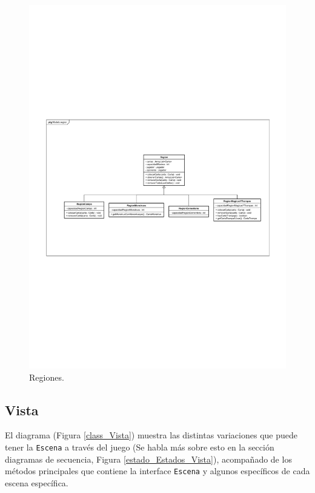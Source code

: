 	\begin{figure}[H]
		\centering
		\includegraphics[scale=0.8]{includes/class_Regiones}
		\caption{Regiones.}
		\label{class_Regiones}
	\end{figure}
	
	\subsection{Vista}
	
	El diagrama (Figura \ref{class_Vista}) muestra las distintas variaciones que puede tener la \texttt{Escena} a través del juego (Se habla más sobre esto en la sección diagramas de secuencia, Figura \ref{estado_Estados_Vista}), acompañado de los métodos principales que contiene la interface \texttt{Escena} y algunos específicos de cada escena específica.
	
